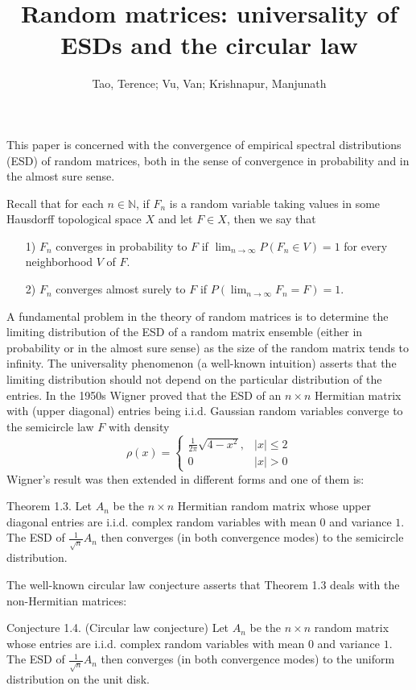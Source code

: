 \documentclass{zbMATH}
\title{Random matrices: universality of ESDs and the circular law} %
\author{Tao, Terence; Vu, Van; Krishnapur, Manjunath} %
\begin{document}
\maketitle

\makefooter

This paper is concerned with the convergence of empirical spectral distributions (ESD) of random matrices, both in the sense of convergence in probability and in the almost sure sense.


Recall that for each \(n\in {\mathbb N}\), if \(F_n\) is a random variable taking values in some Hausdorff topological space \(X\) and let \(F\in X\), then we say that
{\parindent5mm
\begin{itemize}
    \item[1)] \(F_n\) converges in probability to \(F\) if \(\lim_{n\to \infty} P(F_n\in V) = 1\) for every neighborhood \(V\) of \(F\).
    \item[2)] \(F_n\) converges almost surely to \(F\) if \(P(\lim _{n\to \infty} F_n=F) = 1\).
\end{itemize}}
A fundamental problem in the theory of random matrices is to determine the limiting distribution of the ESD of a random matrix ensemble (either in probability or in the almost sure sense) as the size of the random matrix tends to infinity. The universality phenomenon (a well-known intuition) asserts that the limiting distribution should not depend on the particular distribution of the entries. In the 1950s Wigner proved that the ESD of an \(n\times n\) Hermitian matrix with (upper diagonal) entries being i.i.d. Gaussian random variables converge to the semicircle law \(F\) with density 
\[
\rho(x)=\begin{cases} \frac 1{2\pi} \sqrt {4-x^2}, &|x|\leq 2\\ 0 &|x|>0 \end{cases}
\]
Wigner's result was then extended in different forms and one of them is:

Theorem 1.3. Let \(A_n\) be the \(n \times n\) Hermitian random matrix whose upper diagonal entries are i.i.d. complex random variables with mean \(0\) and variance \(1\). The ESD of \(\frac 1{\sqrt n}A_n\) then converges (in both convergence modes) to the semicircle distribution.

 The well-known circular law conjecture asserts that Theorem 1.3 deals with the non-Hermitian matrices: 

Conjecture 1.4. (Circular law conjecture) Let \(A_n\) be the \(n \times n\) random matrix whose entries are i.i.d. complex random variables with mean \(0\) and variance \(1\). The ESD of \(\frac 1{\sqrt n}A_n\) then converges (in both convergence modes) to the uniform distribution on the unit disk.
\end{document}
